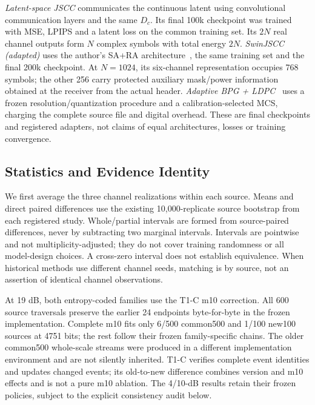\emph{Latent-space JSCC} communicates the continuous latent using convolutional communication layers and the same $D_c$. Its final 100k checkpoint was trained with MSE, LPIPS and a latent loss on the common training set. Its $2N$ real channel outputs form $N$ complex symbols with total energy $2N$. \emph{SwinJSCC (adapted)} uses the author's SA+RA architecture~\cite{yang2023swinjscc}, the same training set and the final 200k checkpoint. At $N=1024$, its six-channel representation occupies 768 symbols; the other 256 carry protected auxiliary mask/power information obtained at the receiver from the actual header. \emph{Adaptive BPG + LDPC}~\cite{bellard2014bpg} uses a frozen resolution/quantization procedure and a calibration-selected MCS, charging the complete source file and digital overhead. These are final checkpoints and registered adapters, not claims of equal architectures, losses or training convergence.

\subsection{Statistics and Evidence Identity}
We first average the three channel realizations within each source. Means and direct paired differences use the existing 10,000-replicate source bootstrap from each registered study. Whole/partial intervals are formed from source-paired differences, never by subtracting two marginal intervals. Intervals are pointwise and not multiplicity-adjusted; they do not cover training randomness or all model-design choices. A cross-zero interval does not establish equivalence. When historical methods use different channel seeds, matching is by source, not an assertion of identical channel observations.

At 19 dB, both entropy-coded families use the T1-C m10 correction. All 600 source traversals preserve the earlier 24 endpoints byte-for-byte in the frozen implementation. Complete m10 fits only 6/500 common500 and 1/100 new100 sources at 4751 bits; the rest follow their frozen family-specific chains. The older common500 whole-scale streams were produced in a different implementation environment and are not silently inherited. T1-C verifies complete event identities and updates changed events; its old-to-new difference combines version and m10 effects and is not a pure m10 ablation. The 4/10-dB results retain their frozen policies, subject to the explicit consistency audit below.



